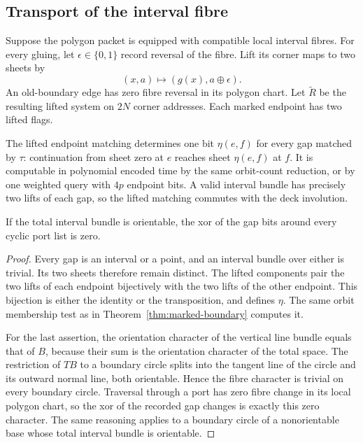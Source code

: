 \subsection{Transport of the interval fibre}

Suppose the polygon packet is equipped with compatible local interval
fibres.  For every gluing, let $\epsilon\in\{0,1\}$ record reversal of
the fibre.  Lift its corner maps to two sheets by
\[
                (x,a)\longmapsto(g(x),a\mathbin\oplus\epsilon).
\]
An old-boundary edge has zero fibre reversal in its polygon chart.  Let
$\widetilde R$ be the resulting lifted system on $2N$ corner addresses.
Each marked endpoint has two lifted flags.

\begin{proposition}
\label{prop:signed-gap}
The lifted endpoint matching determines one bit $\eta(e,f)$ for every
gap matched by $\tau$: continuation from sheet zero at $e$ reaches sheet
$\eta(e,f)$ at $f$.  It is computable in polynomial encoded time by the
same orbit-count reduction, or by one weighted query with $4p$ endpoint
bits.  A valid interval bundle has precisely two lifts of each gap, so the
lifted matching commutes with the deck involution.

If the total interval bundle is orientable, the xor of the gap bits around
every cyclic port list is zero.
\end{proposition}
\begin{proof}
Every gap is an interval or a point, and an interval bundle over either
is trivial.  Its two sheets therefore remain distinct.  The lifted
components pair the two lifts of each endpoint bijectively with the two
lifts of the other endpoint.  This bijection is either the identity or
the transposition, and defines $\eta$.  The same orbit membership test
as in Theorem~\ref{thm:marked-boundary} computes it.

For the last assertion, the orientation character of the vertical
line bundle equals that of $B$, because their sum is the orientation
character of the total space.  The restriction of $TB$ to a boundary
circle splits into the tangent line of the circle and its outward normal
line, both orientable.  Hence the fibre character is trivial on every
boundary circle.  Traversal through a port has zero fibre change in its
local polygon chart, so the xor of the recorded gap changes is exactly
this zero character.  The same reasoning applies to a boundary circle
of a nonorientable base whose total interval bundle is orientable.
\end{proof}

